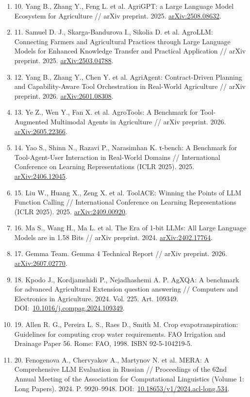 \documentclass[14pt,a4paper]{extarticle}
\begin{document}
\begin{enumerate}[label={},leftmargin=0.9cm,itemindent=-0.9cm,itemsep=0pt,parsep=0pt,topsep=2pt]
\item 10. Yang B., Zhang Y., Feng L. et al. AgriGPT: a Large Language Model Ecosystem for Agriculture // arXiv preprint. 2025. \href{https://arxiv.org/abs/2508.08632}{arXiv:2508.08632}.
\item 11. Samuel D. J., Skarga-Bandurova I., Sikolia D. et al. AgroLLM: Connecting Farmers and Agricultural Practices through Large Language Models for Enhanced Knowledge Transfer and Practical Application // arXiv preprint. 2025. \href{https://arxiv.org/abs/2503.04788}{arXiv:2503.04788}.
\item 12. Yang B., Zhang Y., Chen Y. et al. AgriAgent: Contract-Driven Planning and Capability-Aware Tool Orchestration in Real-World Agriculture // arXiv preprint. 2026. \href{https://arxiv.org/abs/2601.08308}{arXiv:2601.08308}.
\item 13. Ye Z., Wen Y., Fan X. et al. AgroTools: A Benchmark for Tool-Augmented Multimodal Agents in Agriculture // arXiv preprint. 2026. \href{https://arxiv.org/abs/2605.22366}{arXiv:2605.22366}.
\item 14. Yao S., Shinn N., Razavi P., Narasimhan K. τ-bench: A Benchmark for Tool-Agent-User Interaction in Real-World Domains // International Conference on Learning Representations (ICLR 2025). 2025. \href{https://arxiv.org/abs/2406.12045}{arXiv:2406.12045}.
\item 15. Liu W., Huang X., Zeng X. et al. ToolACE: Winning the Points of LLM Function Calling // International Conference on Learning Representations (ICLR 2025). 2025. \href{https://arxiv.org/abs/2409.00920}{arXiv:2409.00920}.
\item 16. Ma S., Wang H., Ma L. et al. The Era of 1-bit LLMs: All Large Language Models are in 1.58 Bits // arXiv preprint. 2024. \href{https://arxiv.org/abs/2402.17764}{arXiv:2402.17764}.
\item 17. Gemma Team. Gemma 4 Technical Report // arXiv preprint. 2026. \href{https://arxiv.org/abs/2607.02770}{arXiv:2607.02770}.
\item 18. Kpodo J., Kordjamshidi P., Nejadhashemi A. P. AgXQA: A benchmark for advanced Agricultural Extension question answering // Computers and Electronics in Agriculture. 2024. Vol. 225. Art. 109349. DOI:~\href{https://doi.org/10.1016/j.compag.2024.109349}{10.1016/j.compag.2024.109349}.
\item 19. Allen R. G., Pereira L. S., Raes D., Smith M. Crop evapotranspiration: Guidelines for computing crop water requirements. FAO Irrigation and Drainage Paper 56. Rome: FAO, 1998. ISBN 92-5-104219-5.
\item 20. Fenogenova A., Chervyakov A., Martynov N. et al. MERA: A Comprehensive LLM Evaluation in Russian // Proceedings of the 62nd Annual Meeting of the Association for Computational Linguistics (Volume 1: Long Papers). 2024. P. 9920–9948. DOI:~\href{https://doi.org/10.18653/v1/2024.acl-long.534}{10.18653/v1/2024.acl-long.534}.
\end{enumerate}\endgroup
\end{document}
